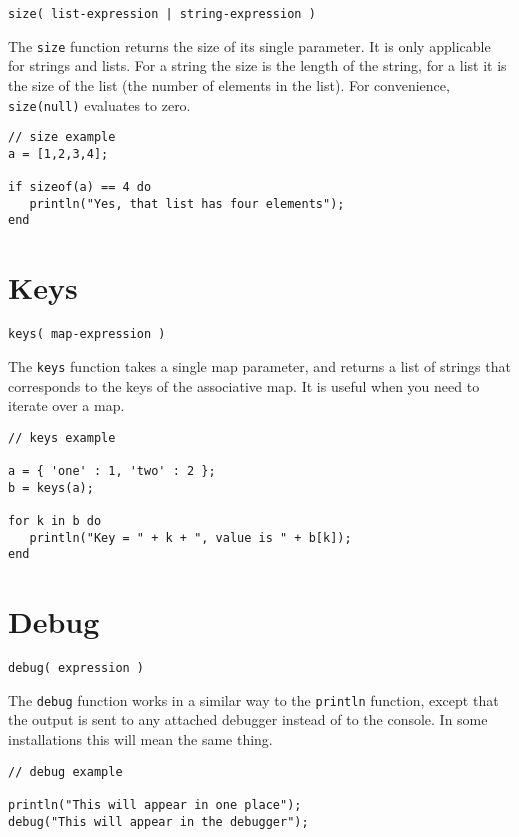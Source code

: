 \begin{Verbatim}
size( list-expression | string-expression )
\end{Verbatim}

The \Verb+size+ function returns the size of its single parameter. It is only applicable for strings and lists. For a string the size is the length of the string, for a list it is the size of the list (the number of elements in the list). For convenience, \verb+size(null)+ evaluates to zero.

\begin{lstlisting}[caption={Size example}]
// size example
a = [1,2,3,4];

if sizeof(a) == 4 do
   println("Yes, that list has four elements");
end

\end{lstlisting}
\section{Keys}

\begin{Verbatim}
keys( map-expression )
\end{Verbatim}

The \Verb+keys+ function takes a single map parameter, and returns a list of strings that corresponds to the keys of the associative map. It is useful when you need to iterate over a map.

\begin{lstlisting}[caption={Keys example}]
// keys example

a = { 'one' : 1, 'two' : 2 };
b = keys(a);

for k in b do
   println("Key = " + k + ", value is " + b[k]);
end

\end{lstlisting}

\section{Debug}

\begin{Verbatim}
debug( expression )
\end{Verbatim}

The \Verb+debug+ function works in a similar way to the \verb+println+ function, except that the output is sent to any attached debugger instead of to the console. In some \Reflex installations this will mean the same thing.

\begin{lstlisting}[caption={Debug example}]
// debug example

println("This will appear in one place");
debug("This will appear in the debugger");

\end{lstlisting}


